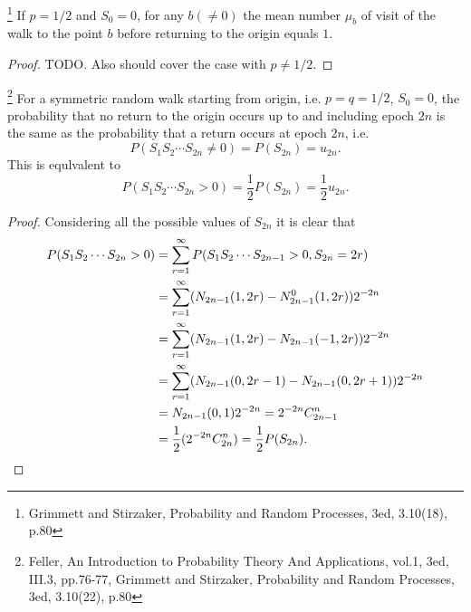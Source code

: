 \begin{theorem}
\footnote{Grimmett and Stirzaker, Probability and Random Processes, 3ed, 
          3.10(18), p.80}
If $p=1/2$ and $S_0=0$, for any $b(\neq 0)$ the mean number $\mu_b$ of visit 
of the walk to the point $b$ before returning to the origin equals $1$.
\end{theorem}
\begin{proof}
TODO. Also should cover the case with $p\neq 1/2$.
\end{proof}


\begin{lemma} \label{L:rw_noreturn}
\footnote{Feller, An Introduction to Probability Theory And Applications, 
          vol.1, 3ed, III.3, pp.76-77,
          Grimmett and Stirzaker, Probability and Random Processes, 3ed, 
          3.10(22), p.80}
For a symmetric random walk starting from origin, i.e. $p=q=1/2$, $S_0=0$, 
the probability that no return to the origin occurs up to and including
epoch $2n$ is the same as the probability that a return occurs at epoch 
$2n$, i.e.
\begin{equation}
  P(S_1 S_2\cdots S_{2n}\neq 0) = P(S_{2n}) = u_{2n}.
\end{equation}
This is equlvalent to 
\begin{equation}
  P(S_1 S_2\cdots S_{2n}> 0) = \frac{1}{2} P(S_{2n}) = \frac{1}{2} u_{2n}.
\end{equation}
\end{lemma}
\begin{proof}
Considering all the possible values of $S_{2n}$ it is clear that
\begin{align*}
  P(S_1 S_2\cdots S_{2n}> 0) 
    &= \sum_{r=1}^{\infty} P(S_1 S_2\cdots S_{2n-1}>0, S_{2n}=2r) \notag \\
    &= \sum_{r=1}^{\infty} (N_{2n-1}(1,2r)-N_{2n-1}^0(1,2r)) 2^{-2n} \notag \\
    &= \sum_{r=1}^{\infty} (N_{2n-1}(1,2r)-N_{2n-1}(-1,2r)) 2^{-2n} \notag \\
    &= \sum_{r=1}^{\infty} (N_{2n-1}(0,2r-1)-N_{2n-1}(0,2r+1)) 2^{-2n} \notag \\
    &= N_{2n-1}(0,1) 2^{-2n}  = 2^{-2n} C_{2n-1}^n \notag \\
    &= \frac{1}{2} (2^{-2n} C_{2n}^n) = \frac{1}{2} P(S_{2n}). 
\end{align*}
\end{proof}


